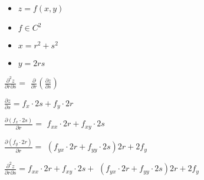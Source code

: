 \documentclass[../practica_04.tex]{subfiles}
\begin{document}
    \begin{itemize}
        \item $z = f(x,y)$
        \item $f \in C^2$
        \item $x = r^2 + s^2$
        \item $y = 2rs$
    \end{itemize}

    $ \frac{\partial^2 z}{\partial r \partial s} = $
    $ \frac{\partial}{\partial r} (\frac{\partial z}{\partial s}) $

    $\frac{\partial z}{\partial s} = f_x \cdot 2s + f_y \cdot 2r $

    $\frac{\partial (f_x \cdot 2s) }{\partial r}  = $
    $ f_{xx} \cdot 2r + f_{xy} \cdot 2s $

    $\frac{\partial (f_y \cdot 2r) }{\partial r}  = $
    $ (f_{yx} \cdot 2r + f_{yy} \cdot 2s)2r + 2f_y $

    $ \frac{\partial^2 z}{\partial r \partial s} = f_{xx} \cdot 2r + f_{xy} \cdot 2s + $
    $ (f_{yx} \cdot 2r + f_{yy} \cdot 2s)2r + 2f_y $
\end{document}
